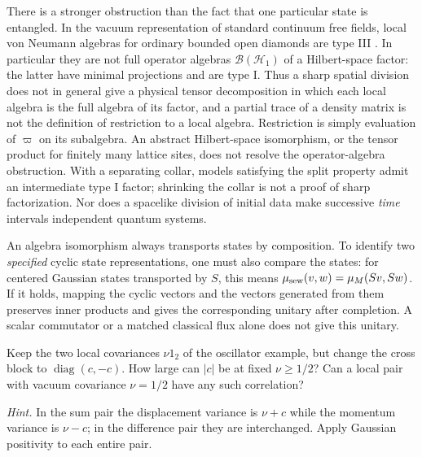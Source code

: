 There is a stronger obstruction than the fact that one particular state is
entangled. In the vacuum representation of standard continuum free fields,
local von Neumann algebras for ordinary bounded open diamonds are type III
\cite{Haag}. In particular they are not full operator algebras
$\mathcal B(\mathcal H_1)$ of a Hilbert-space factor: the latter have
minimal projections and are type I. Thus a sharp spatial division does not
in general give a physical tensor decomposition in which each local algebra
is the full algebra of its factor, and a partial trace of a density matrix
is not the definition of restriction to a local algebra. Restriction is
simply evaluation of $\varpi$ on its subalgebra. An abstract Hilbert-space
isomorphism, or the tensor product for finitely many lattice sites, does
not resolve the operator-algebra obstruction. With a separating collar,
models satisfying the split property admit an intermediate type I factor;
shrinking the collar is not a proof of sharp factorization. Nor does a
spacelike division of initial data make successive \emph{time} intervals
independent quantum systems.

An algebra isomorphism always transports states by composition. To identify
two \emph{specified} cyclic state representations, one must also compare
the states: for centered Gaussian states transported by $S$, this means
$\mu_{\rm sew}(v,w)=\mu_M(Sv,Sw)$. If it holds, mapping the cyclic vectors
and the vectors generated from them preserves inner products and gives the
corresponding unitary after completion. A scalar commutator or a matched
classical flux alone does not give this unitary.

\begin{exercise}
Keep the two local covariances $\nu 1_2$ of the oscillator example, but
change the cross block to $\operatorname{diag}(c,-c)$. How large can
$|c|$ be at fixed $\nu\ge1/2$? Can a local pair with vacuum covariance
$\nu=1/2$ have any such correlation?
\end{exercise}
\noindent\emph{Hint.} In the sum pair the displacement variance is
$\nu+c$ while the momentum variance is $\nu-c$; in the difference pair
they are interchanged. Apply Gaussian positivity to each entire pair.
